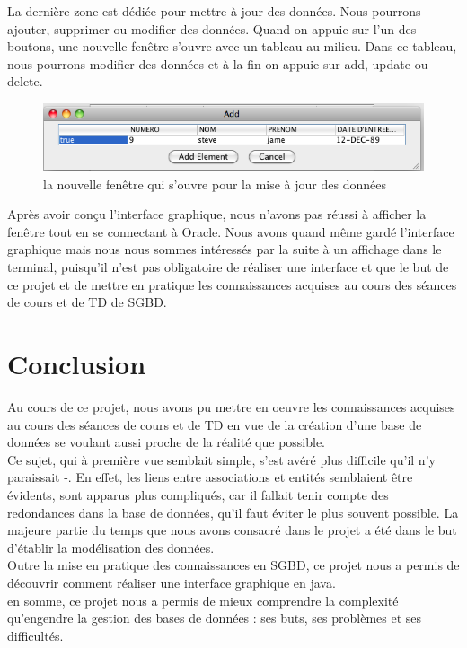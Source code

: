 \documentclass{article}
\begin{document}
La dernière zone est dédiée pour mettre à jour des données. Nous pourrons ajouter, supprimer ou modifier des données. Quand on appuie sur l'un des boutons, une nouvelle fenêtre s'ouvre avec un tableau au milieu. Dans ce tableau, nous pourrons modifier des données et à la fin on appuie sur add, update ou delete. \\


\begin{figure}[!h]
\centering
\includegraphics[scale = 0.4] {4.png}
\caption{la nouvelle fenêtre qui s'ouvre pour la mise à jour des données}
\end{figure}


Après avoir conçu l'interface graphique, nous n'avons pas réussi à afficher la fenêtre tout en se connectant à Oracle. Nous avons quand même gardé l'interface graphique mais nous nous sommes intéressés par la suite à un affichage dans le terminal, puisqu'il n'est pas obligatoire de réaliser une interface et que le but de ce projet et de mettre en pratique les connaissances acquises au cours des séances de cours et de TD de SGBD. 

\newpage
\section*{Conclusion}
Au cours de ce projet, nous avons pu mettre en oeuvre les connaissances acquises au cours des séances de cours et de TD en vue de la création d'une base de données se voulant aussi proche de la réalité que possible. \\

Ce sujet, qui à première vue semblait simple, s'est avéré plus difficile qu'il n'y paraissait -. En effet, les liens entre associations et entités semblaient être évidents, sont apparus plus compliqués, car il fallait tenir compte des redondances dans la base de données, qu'il faut éviter le plus souvent possible. La majeure partie du temps que nous avons consacré dans le projet a été dans le but d'établir la modélisation des données.  \\

Outre la mise en pratique des connaissances en SGBD, ce projet nous a permis de découvrir comment réaliser une interface graphique en java. \\

en somme, ce projet nous a permis de mieux comprendre la complexité qu'engendre la gestion des bases de données : ses buts, ses problèmes et ses difficultés. 
\end{document}
